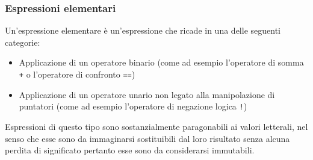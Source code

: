 \subsubsection{Espressioni elementari}
Un'espressione elementare è un'espressione che ricade in una delle seguenti categorie:
\begin{itemize}
    \item Applicazione di un operatore binario (come ad esempio l'operatore di somma \texttt{+} o l'operatore di confronto \texttt{==})
    \item Applicazione di un operatore unario non legato alla manipolazione di puntatori (come ad esempio l'operatore di negazione logica \texttt{!})
\end{itemize}
Espressioni di questo tipo sono sostanzialmente paragonabili ai valori letterali, nel senso che 
esse sono da immaginarsi sostituibili dal loro risultato senza alcuna perdita di significato pertanto 
esse sono da considerarsi immutabili.